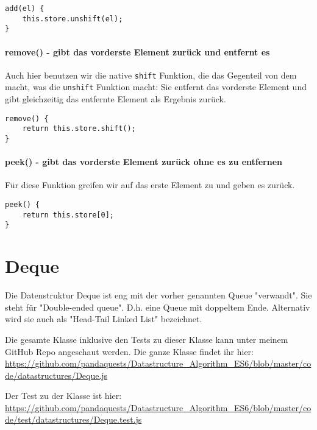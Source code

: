 \documentclass[babel]{book}
\begin{document}
\begin{lstlisting}[caption=Array Konstruktor]
add(el) {
	this.store.unshift(el);
}
\end{lstlisting}

\paragraph{remove() - gibt das vorderste Element zurück und entfernt es} Auch hier benutzen wir die native \lstinline|shift| Funktion, die das Gegenteil von dem macht, was die \lstinline|unshift| Funktion macht: Sie entfernt das vorderste Element und gibt gleichzeitig das entfernte Element als Ergebnis zurück.

\begin{lstlisting}[caption=Array Konstruktor]
remove() {
	return this.store.shift();
}
\end{lstlisting}

\paragraph{peek() - gibt das vorderste Element zurück ohne es zu entfernen} Für diese Funktion greifen wir auf das erste Element zu und geben es zurück.

\begin{lstlisting}[caption=Array Konstruktor]
peek() {
	return this.store[0];
}
\end{lstlisting}

\section{Deque}
Die Datenstruktur Deque ist eng mit der vorher genannten Queue "verwandt". Sie steht für "Double-ended queue". D.h. eine Queue mit doppeltem Ende. Alternativ wird sie auch als "Head-Tail Linked List" bezeichnet. 

Die gesamte Klasse inklusive den Tests zu dieser Klasse kann unter meinem GitHub Repo angeschaut werden. Die ganze Klasse findet ihr hier: \url{https://github.com/pandaquests/Datastructure_Algorithm_ES6/blob/master/code/datastructures/Deque.js}

Der Test zu der Klasse ist hier: \url{https://github.com/pandaquests/Datastructure_Algorithm_ES6/blob/master/code/test/datastructures/Deque.test.js}
\end{document}
